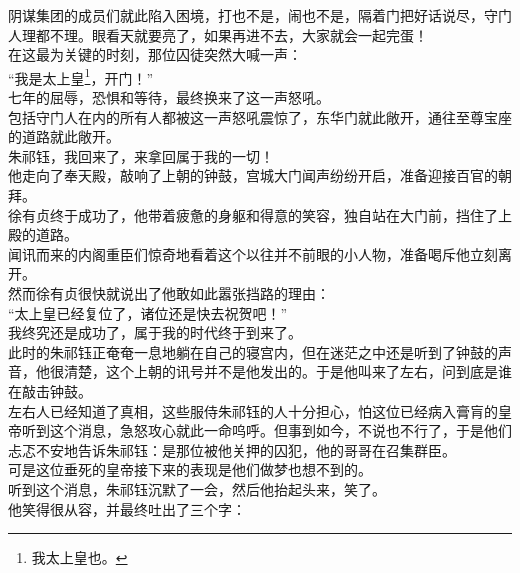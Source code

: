 \begin{multicols}{\theparacolNo}
阴谋集团的成员们就此陷入困境，打也不是，闹也不是，隔着门把好话说尽，守门人理都不理。眼看天就要亮了，如果再进不去，大家就会一起完蛋！\\

在这最为关键的时刻，那位囚徒突然大喊一声：\\

“我是太上皇\footnote{我太上皇也。}，开门！”\\

七年的屈辱，恐惧和等待，最终换来了这一声怒吼。\\

包括守门人在内的所有人都被这一声怒吼震惊了，东华门就此敞开，通往至尊宝座的道路就此敞开。\\

朱祁钰，我回来了，来拿回属于我的一切！\\

他走向了奉天殿，敲响了上朝的钟鼓，宫城大门闻声纷纷开启，准备迎接百官的朝拜。\\

徐有贞终于成功了，他带着疲惫的身躯和得意的笑容，独自站在大门前，挡住了上殿的道路。\\

闻讯而来的内阁重臣们惊奇地看着这个以往并不前眼的小人物，准备喝斥他立刻离开。\\

然而徐有贞很快就说出了他敢如此嚣张挡路的理由：\\

“太上皇已经复位了，诸位还是快去祝贺吧！”\\

我终究还是成功了，属于我的时代终于到来了。\\

此时的朱祁钰正奄奄一息地躺在自己的寝宫内，但在迷茫之中还是听到了钟鼓的声音，他很清楚，这个上朝的讯号并不是他发出的。于是他叫来了左右，问到底是谁在敲击钟鼓。\\

左右人已经知道了真相，这些服侍朱祁钰的人十分担心，怕这位已经病入膏肓的皇帝听到这个消息，急怒攻心就此一命呜呼。但事到如今，不说也不行了，于是他们忐忑不安地告诉朱祁钰：是那位被他关押的囚犯，他的哥哥在召集群臣。\\

可是这位垂死的皇帝接下来的表现是他们做梦也想不到的。\\

听到这个消息，朱祁钰沉默了一会，然后他抬起头来，笑了。\\

他笑得很从容，并最终吐出了三个字：\\


\end{multicols}
